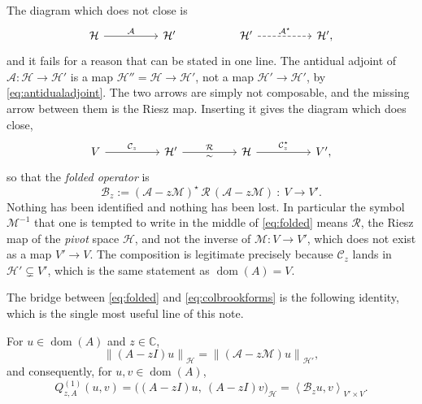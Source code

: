 \documentclass[11pt,a4paper]{article}
\theoremstyle{plain}
\newcommand{\C}{\mathbb{C}}
\newcommand{\norm}[1]{\left\|#1\right\|}
\newcommand{\dual}[2]{\left\langle #1, #2 \right\rangle}
\newcommand{\Hb}{\mathcal{H}}
\newcommand{\Vb}{V}
\newcommand{\Aop}{\mathcal{A}}
\newcommand{\Bop}{\mathcal{B}}
\DeclareMathOperator{\dom}{dom}
\newcommand{\adj}{\star}                 %
\newcommand{\Riesz}{\mathcal{R}}         %
\newcommand{\Mass}{\mathcal{M}}          %
\begin{document}
The diagram which does not close is
\begin{equation}
  \label{eq:baddiagram}
  \begin{tikzcd}[column sep=huge]
    \Hb \arrow[r, "\Aop"] & \Hb'
    & \Hb' \arrow[r, "\Aop^{\adj}", dashed] & \Hb' ,
  \end{tikzcd}
\end{equation}
and it fails for a reason that can be stated in one line.  The antidual adjoint
of $\Aop \colon \Hb \to \Hb'$ is a map $\Hb'' = \Hb \to \Hb'$, not a map
$\Hb' \to \Hb'$, by \cref{eq:antidualadjoint}.  The two arrows are simply not
composable, and the missing arrow between them is the Riesz map.  Inserting it
gives the diagram which does close,
\begin{equation}
  \label{eq:gooddiagram}
  \begin{tikzcd}[column sep=huge]
    \Vb \arrow[r, "\mathcal{C}_z"] & \Hb' \arrow[r, "\Riesz", "\sim"']
    & \Hb \arrow[r, "\mathcal{C}_z^{\adj}"] & \Vb' ,
  \end{tikzcd}
\end{equation}
so that the \emph{folded operator} is
\begin{equation}
  \label{eq:folded}
  \boxed{\ \Bop_z := (\Aop - z\Mass)^{\adj}\,\Riesz\,(\Aop - z\Mass)
    \ \colon\ \Vb \longrightarrow \Vb' .\ }
\end{equation}
Nothing has been identified and nothing has been lost.  In particular the
symbol $\Mass^{-1}$ that one is tempted to write in the middle of
\cref{eq:folded} means $\Riesz$, the Riesz map of the \emph{pivot} space $\Hb$,
and not the inverse of $\Mass \colon \Vb \to \Vb'$, which does not exist as a
map $\Vb' \to \Vb$.  The composition is legitimate precisely because
$\mathcal{C}_z$ lands in $\Hb' \subsetneq \Vb'$, which is the same statement as
$\dom(A) = \Vb$.

The bridge between \cref{eq:folded} and \cref{eq:colbrookforms} is the following
identity, which is the single most useful line of this note.

\begin{proposition}
  \label{prop:residual}
  For $u \in \dom(A)$ and $z \in \C$,
  \begin{equation}
    \label{eq:residual}
    \norm{(A - zI)u}_{\Hb} = \norm{(\Aop - z\Mass)u}_{\Hb'} ,
  \end{equation}
  and consequently, for $u,v \in \dom(A)$,
  \begin{equation}
    \label{eq:formfolded}
    Q^{(1)}_{z,A}(u,v)
      = \bigl((A-zI)u,\ (A-zI)v\bigr)_{\Hb}
      = \dual{\Bop_z u}{v}_{\Vb' \times \Vb} .
  \end{equation}
\end{proposition}
\end{document}
